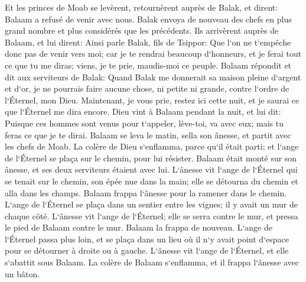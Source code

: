\verse Et les princes de Moab se levèrent, retournèrent auprès de Balak, et dirent: Balaam a refusé de venir avec nous. 
\verse Balak envoya de nouveau des chefs en plus grand nombre et plus considérés que les précédents. 
\verse Ils arrivèrent auprès de Balaam, et lui dirent: Ainsi parle Balak, fils de Tsippor: Que l`on ne t`empêche donc pas de venir vers moi; 
\verse car je te rendrai beaucoup d`honneurs, et je ferai tout ce que tu me diras; viens, je te prie, maudis-moi ce peuple. 
\verse Balaam répondit et dit aux serviteurs de Balak: Quand Balak me donnerait sa maison pleine d`argent et d`or, je ne pourrais faire aucune chose, ni petite ni grande, contre l`ordre de l`Éternel, mon Dieu. 
\verse Maintenant, je vous prie, restez ici cette nuit, et je saurai ce que l`Éternel me dira encore. 
\verse Dieu vint à Balaam pendant la nuit, et lui dit: Puisque ces hommes sont venus pour t`appeler, lève-toi, va avec eux; mais tu feras ce que je te dirai. 
\verse Balaam se leva le matin, sella son ânesse, et partit avec les chefs de Moab. 
\verse La colère de Dieu s`enflamma, parce qu`il était parti; et l`ange de l`Éternel se plaça sur le chemin, pour lui résister. Balaam était monté sur son ânesse, et ses deux serviteurs étaient avec lui. 
\verse L`ânesse vit l`ange de l`Éternel qui se tenait sur le chemin, son épée nue dans la main; elle se détourna du chemin et alla dans les champs. Balaam frappa l`ânesse pour la ramener dans le chemin. 
\verse L`ange de l`Éternel se plaça dans un sentier entre les vignes; il y avait un mur de chaque côté. 
\verse L`ânesse vit l`ange de l`Éternel; elle se serra contre le mur, et pressa le pied de Balaam contre le mur. Balaam la frappa de nouveau. 
\verse L`ange de l`Éternel passa plus loin, et se plaça dans un lieu où il n`y avait point d`espace pour se détourner à droite ou à gauche. 
\verse L`ânesse vit l`ange de l`Éternel, et elle s`abattit sous Balaam. La colère de Balaam s`enflamma, et il frappa l`ânesse avec un bâton. 
